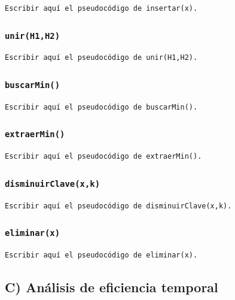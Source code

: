 \documentclass[11pt]{article}
\begin{document}
\begin{verbatim}
Escribir aquí el pseudocódigo de insertar(x).
\end{verbatim}

\subsubsection{\texttt{unir(H1,H2)}}
\label{sec:org1221b18}

\begin{verbatim}
Escribir aquí el pseudocódigo de unir(H1,H2).
\end{verbatim}

\subsubsection{\texttt{buscarMin()}}
\label{sec:org1179a0b}

\begin{verbatim}
Escribir aquí el pseudocódigo de buscarMin().
\end{verbatim}

\subsubsection{\texttt{extraerMin()}}
\label{sec:org7ec6bd1}

\begin{verbatim}
Escribir aquí el pseudocódigo de extraerMin().
\end{verbatim}

\subsubsection{\texttt{disminuirClave(x,k)}}
\label{sec:org8964af9}

\begin{verbatim}
Escribir aquí el pseudocódigo de disminuirClave(x,k).
\end{verbatim}

\subsubsection{\texttt{eliminar(x)}}
\label{sec:org2ddf2f1}

\begin{verbatim}
Escribir aquí el pseudocódigo de eliminar(x).
\end{verbatim}

\subsection{C) Análisis de eficiencia temporal}
\label{sec:org856e5bb}
\end{document}
